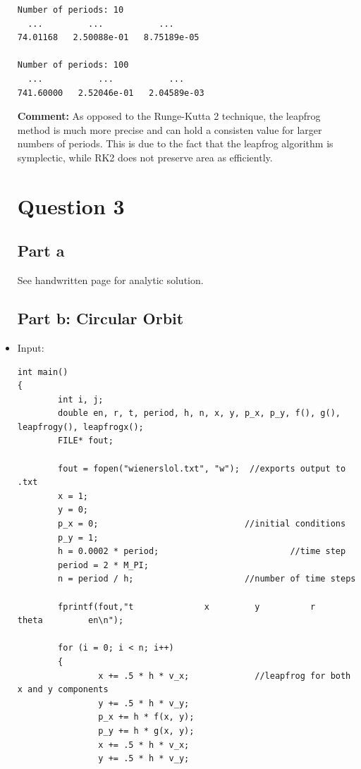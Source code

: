 \documentclass[10pt]{article}
\begin{document}
\begin{itemize}
\begin{verbatim}
Number of periods: 10
  ...         ...           ...
74.01168   2.50088e-01   8.75189e-05

Number of periods: 100
  ...           ...           ...
741.60000   2.52046e-01   2.04589e-03

\end{verbatim}
\textbf{Comment:} As opposed to the Runge-Kutta 2 technique, the leapfrog method is much more precise and can hold a consisten value for larger numbers of periods. This is due to the fact that the leapfrog algorithm is symplectic, while RK2 does not preserve area as efficiently. 

\section*{Question 3}
\subsection*{Part a}
See handwritten page for analytic solution.

\subsection*{Part b: Circular Orbit}
\item Input:
\begin{verbatim}
int main()
{
        int i, j;
        double en, r, t, period, h, n, x, y, p_x, p_y, f(), g(), leapfrogy(), leapfrogx();
        FILE* fout;
        
        fout = fopen("wienerslol.txt", "w");  //exports output to .txt
        x = 1;
        y = 0; 
        p_x = 0;                             //initial conditions
        p_y = 1;
        h = 0.0002 * period;                          //time step
        period = 2 * M_PI;
        n = period / h;                      //number of time steps
        
        fprintf(fout,"t              x         y          r       theta         en\n");
        
        for (i = 0; i < n; i++)
        {
                x += .5 * h * v_x;             //leapfrog for both x and y components
                y += .5 * h * v_y;
                p_x += h * f(x, y);
                p_y += h * g(x, y);
                x += .5 * h * v_x;
                y += .5 * h * v_y;
                

\end{verbatim}
\end{itemize}
\end{document}
